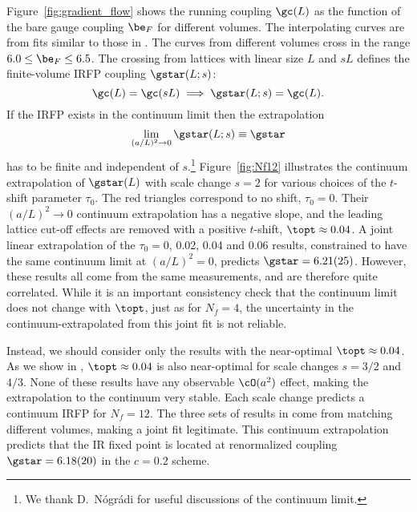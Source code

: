 Figure~\ref{fig:gradient_flow} shows the running coupling $\gc(L)$ as the function of the bare gauge coupling $\be_F$ for different volumes.
The interpolating curves are from fits similar to those in .
The curves from different volumes cross in the range $6.0 \leq \be_F \leq 6.5$.
The crossing from lattices with linear size $L$ and $sL$ defines the finite-volume IRFP coupling $\gstar(L; s)$:
\begin{equation}
  \gc(L) = \gc(sL) \implies \gstar(L; s) = \gc(L).
\end{equation}
If the IRFP exists in the continuum limit then the extrapolation
\begin{equation}
  \lim_{(a / L)^2 \to 0} \gstar(L; s) \equiv \gstar
\end{equation}
has to be finite and independent of $s$.\footnote{We thank D.~N\'ogr\'adi for useful discussions of the continuum limit.}
Figure~\ref{fig:Nf12} illustrates the continuum extrapolation of $\gstar(L)$ with scale change $s = 2$ for various choices of the $t$-shift parameter $\tau_0$.
The red triangles correspond to no shift, $\tau_0 = 0$.
Their $(a / L)^2 \to 0$ continuum extrapolation has a negative slope, and the leading lattice cut-off effects are removed with a positive $t$-shift, $\topt \approx 0.04$.
A joint linear extrapolation of the $\tau_0 = 0$, 0.02, 0.04 and 0.06 results, constrained to have the same continuum limit at $(a / L)^2 = 0$, predicts $\gstar = 6.21(25)$.
However, these results all come from the same measurements, and are therefore quite correlated.
While it is an important consistency check that the continuum limit does not change with $\topt$, just as for $N_f = 4$, the uncertainty in the continuum-extrapolated \gstar from this joint fit is not reliable.

Instead, we should consider only the results with the near-optimal $\topt \approx 0.04$.
As we show in , $\topt \approx 0.04$ is also near-optimal for scale changes $s = 3 / 2$ and $4 / 3$.
None of these results have any observable $\cO(a^2)$ effect, making the extrapolation to the continuum very stable.
Each scale change predicts a continuum IRFP for $N_f = 12$.
The three sets of results in  come from matching different volumes, making a joint fit legitimate.
This continuum extrapolation predicts that the IR fixed point is located at renormalized coupling $\gstar = 6.18(20)$ in the $c = 0.2$ scheme.

